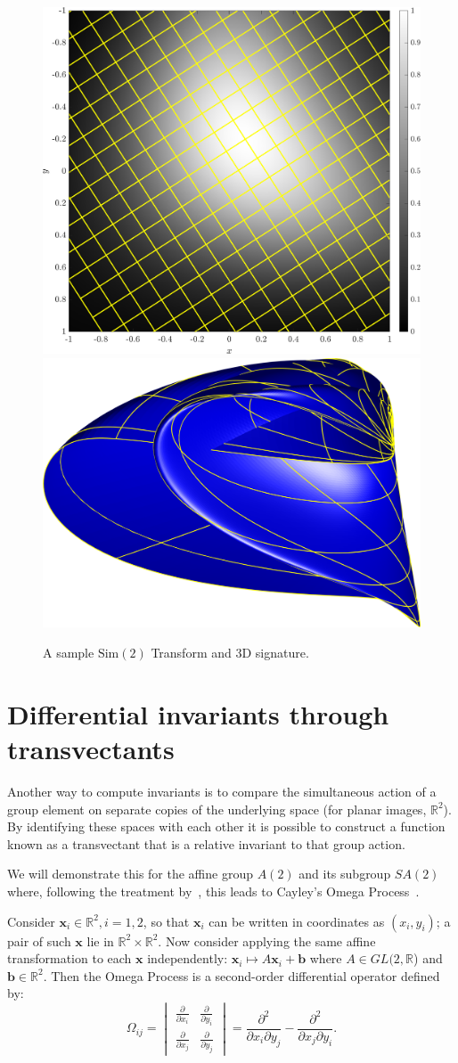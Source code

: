 \documentclass[review,onefignum,onetabnum]{siamonline190516}
\begin{document}
\begin{figure}
\centering
\includegraphics[width=.45\textwidth]{Figs/f_transformed_Sim2.png}
\includegraphics[width=.45\textwidth]{Figs/Sim2_signature.png}
\caption{A sample $\text{Sim}(2)$ Transform and 3D signature.}
\label{fig:Sim2}
\end{figure}

\section{Differential invariants through transvectants}

Another way to compute invariants is to compare the simultaneous action of a group element on separate copies of the underlying space (for planar images, $\mathbb{R}^2$). By identifying these spaces with each other it is possible to construct a function known as a transvectant that is a relative invariant to that group action.

We will demonstrate this for the affine group $A(2)$ and its subgroup
$SA(2)$ where, following the treatment by~\citet{OlverCIT}, this leads to
Cayley's Omega Process~\citep{Cayley1846}. 

Consider $\mathbf{x}_i \in \mathbb{R}^2, i=1,2$, so that $\mathbf{x}_i$ can
be written in coordinates as $(x_i, y_i)$; a pair of such $\mathbf{x}$ lie in $\mathbb{R}^2 \times \mathbb{R}^2$. Now consider applying the same affine transformation to each $\mathbf{x}$ independently: $\mathbf{x}_i \mapsto A \mathbf{x}_i + \mathbf{b}$ where $A \in GL(2,\mathbb{R}$) and $\mathbf{b} \in \mathbb{R}^2$. Then the Omega Process is a second-order differential operator defined by: 
\begin{equation}
\Omega_{ij} = \begin{vmatrix} \frac{\partial}{\partial x_i} &
\frac{\partial}{\partial y_i} \\ \frac{\partial}{\partial x_j} &
\frac{\partial}{\partial y_j} \end{vmatrix} = 
\frac{\partial^2}{\partial x_i
\partial y_j} - \frac{\partial^2}{\partial x_j \partial y_i}.
\end{equation}
\end{document}
